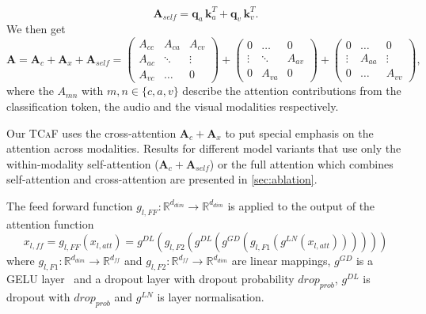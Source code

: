 \documentclass[runningheads]{llncs}
\newcommand{\mypara}[1]{\noindent{\bf{#1}}}
\newcommand{\modelName}{\textsc{TCaF}\xspace}
\begin{document}
\begin{equation*}
\mathbf{A}_{self} 
= \mathbf{q}_a \, \mathbf{k}_a^T + \mathbf{q}_v \, \mathbf{k}_v^T.
\end{equation*}
We then get
\begin{equation}
\mathbf{A} = \mathbf{A}_c + \mathbf{A}_x + \mathbf{A}_{self} 
= \begin{pmatrix}
A_{cc} & A_{ca} & A_{cv}\\
A_{ac} & \ddots & \vdots \\
A_{vc} & \hdots & 0
\end{pmatrix}
+ \begin{pmatrix}
0 & \hdots & 0 \\
\vdots & \ddots & A_{av} \\
0 & A_{va} & 0
\end{pmatrix}
+ \begin{pmatrix}
0 & \hdots & 0 \\
\vdots & A_{aa} & \vdots \\
0 & \hdots & A_{vv}
\end{pmatrix},
\end{equation}
where the $A_{mn}$ with $m,n \in \{c,a,v\}$ describe the attention contributions from the classification token, the audio and the visual modalities respectively.

Our \modelName uses the cross-attention $\mathbf{A}_c + \mathbf{A}_{x}$ to put special emphasis on the attention across modalities. 
Results for different model variants that use only the within-modality self-attention ($\mathbf{A}_c + \mathbf{A}_{self}$) or the full attention which combines self-attention and cross-attention are presented in \cref{sec:ablation}. 

\mypara{Feed forward function.} The feed forward function $g_{l,FF}: \mathbb{R}^{d_{dim}} \xrightarrow{} \mathbb{R}^{d_{dim}}$ is applied to the output of the attention function
\begin{equation}
    x_{l,ff} = g_{l, FF}(x_{l,att})=g^{DL}(g_{l,F2}(g^{DL}(g^{GD}(g_{l,F1}(g^{LN}(x_{l,att}))))))
\end{equation}
where $g_{l,F1}: \mathbb{R}^{d_{dim}} \xrightarrow{} \mathbb{R}^{d_{ff}}$ and $g_{l,F2}: \mathbb{R}^{d_{ff}} \xrightarrow{} \mathbb{R}^{d_{dim}}$ are linear mappings, $g^{GD}$ is a GELU layer~\cite{hendrycks2016gaussian} and a dropout layer with dropout probability $drop_{prob}$, $g^{DL}$ is dropout with $drop_{prob}$ and $g^{LN}$ is layer normalisation. 
\end{document}
